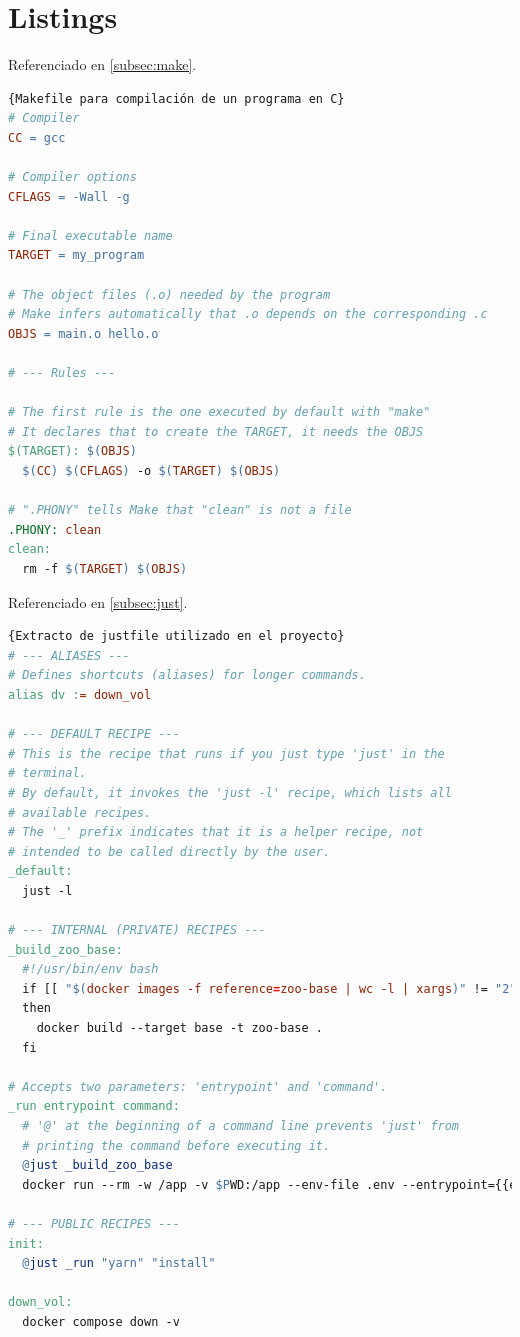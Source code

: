 \clearpage

\section{Listings}

Referenciado en \ref{subsec:make}.

\begin{lstlisting}[language=make,label=lst:make]{Makefile para compilación de un programa en C}
# Compiler
CC = gcc

# Compiler options
CFLAGS = -Wall -g

# Final executable name
TARGET = my_program

# The object files (.o) needed by the program
# Make infers automatically that .o depends on the corresponding .c
OBJS = main.o hello.o

# --- Rules ---

# The first rule is the one executed by default with "make"
# It declares that to create the TARGET, it needs the OBJS
$(TARGET): $(OBJS)
  $(CC) $(CFLAGS) -o $(TARGET) $(OBJS)

# ".PHONY" tells Make that "clean" is not a file
.PHONY: clean
clean:
  rm -f $(TARGET) $(OBJS)
\end{lstlisting}

Referenciado en \ref{subsec:just}.

\begin{lstlisting}[language=make,label=lst:just]{Extracto de justfile utilizado en el proyecto}
# --- ALIASES ---
# Defines shortcuts (aliases) for longer commands.
alias dv := down_vol

# --- DEFAULT RECIPE ---
# This is the recipe that runs if you just type 'just' in the
# terminal.
# By default, it invokes the 'just -l' recipe, which lists all
# available recipes.
# The '_' prefix indicates that it is a helper recipe, not
# intended to be called directly by the user.
_default:
  just -l

# --- INTERNAL (PRIVATE) RECIPES ---
_build_zoo_base:
  #!/usr/bin/env bash
  if [[ "$(docker images -f reference=zoo-base | wc -l | xargs)" != "2" ]]
  then
    docker build --target base -t zoo-base .
  fi

# Accepts two parameters: 'entrypoint' and 'command'.
_run entrypoint command:
  # '@' at the beginning of a command line prevents 'just' from
  # printing the command before executing it.
  @just _build_zoo_base
  docker run --rm -w /app -v $PWD:/app --env-file .env --entrypoint={{entrypoint}} zoo-base {{command}}

# --- PUBLIC RECIPES ---
init:
  @just _run "yarn" "install"

down_vol:
  docker compose down -v
\end{lstlisting}

